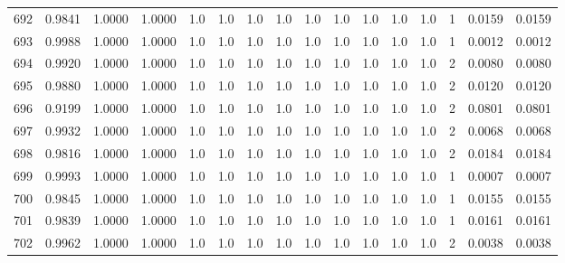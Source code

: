 \begin{tabular}{lrrrrrrrrrrrrrrr}
692 &      0.9841 &  1.0000 &  1.0000 &     1.0 &     1.0 &     1.0 &     1.0 &     1.0 &     1.0 &     1.0 &      1.0 &        1.0 &      1 &                    0.0159 &                     0.0159 \\
693 &      0.9988 &  1.0000 &  1.0000 &     1.0 &     1.0 &     1.0 &     1.0 &     1.0 &     1.0 &     1.0 &      1.0 &        1.0 &      1 &                    0.0012 &                     0.0012 \\
694 &      0.9920 &  1.0000 &  1.0000 &     1.0 &     1.0 &     1.0 &     1.0 &     1.0 &     1.0 &     1.0 &      1.0 &        1.0 &      2 &                    0.0080 &                     0.0080 \\
695 &      0.9880 &  1.0000 &  1.0000 &     1.0 &     1.0 &     1.0 &     1.0 &     1.0 &     1.0 &     1.0 &      1.0 &        1.0 &      2 &                    0.0120 &                     0.0120 \\
696 &      0.9199 &  1.0000 &  1.0000 &     1.0 &     1.0 &     1.0 &     1.0 &     1.0 &     1.0 &     1.0 &      1.0 &        1.0 &      2 &                    0.0801 &                     0.0801 \\
697 &      0.9932 &  1.0000 &  1.0000 &     1.0 &     1.0 &     1.0 &     1.0 &     1.0 &     1.0 &     1.0 &      1.0 &        1.0 &      2 &                    0.0068 &                     0.0068 \\
698 &      0.9816 &  1.0000 &  1.0000 &     1.0 &     1.0 &     1.0 &     1.0 &     1.0 &     1.0 &     1.0 &      1.0 &        1.0 &      2 &                    0.0184 &                     0.0184 \\
699 &      0.9993 &  1.0000 &  1.0000 &     1.0 &     1.0 &     1.0 &     1.0 &     1.0 &     1.0 &     1.0 &      1.0 &        1.0 &      1 &                    0.0007 &                     0.0007 \\
700 &      0.9845 &  1.0000 &  1.0000 &     1.0 &     1.0 &     1.0 &     1.0 &     1.0 &     1.0 &     1.0 &      1.0 &        1.0 &      1 &                    0.0155 &                     0.0155 \\
701 &      0.9839 &  1.0000 &  1.0000 &     1.0 &     1.0 &     1.0 &     1.0 &     1.0 &     1.0 &     1.0 &      1.0 &        1.0 &      1 &                    0.0161 &                     0.0161 \\
702 &      0.9962 &  1.0000 &  1.0000 &     1.0 &     1.0 &     1.0 &     1.0 &     1.0 &     1.0 &     1.0 &      1.0 &        1.0 &      2 &                    0.0038 &                     0.0038 \\

\end{tabular}
